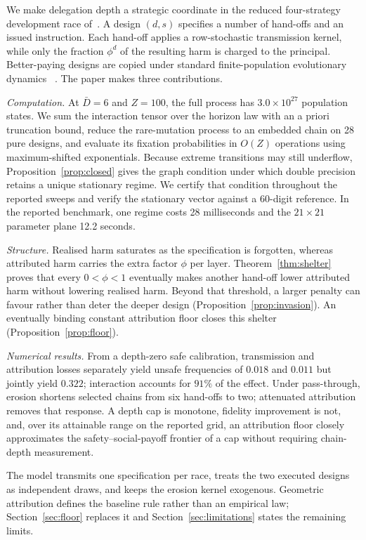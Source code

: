 \documentclass[a4paper,fleqn]{cas-sc}
\begin{document}
We make delegation depth a strategic coordinate in the reduced four-strategy
development race of~\citet{domingos2026falling}. A design $(d,s)$ specifies a
number of hand-offs and an issued instruction. Each hand-off applies a
row-stochastic transmission kernel, while only the fraction $\phi^{d}$ of the
resulting harm is charged to the principal. Better-paying designs are copied
under standard finite-population evolutionary dynamics
~\citep{taylor1978ess,hofbauer1998evolutionary,traulsen2006stochastic}. The
paper makes three contributions.

\emph{Computation.} At $\bar D=6$ and $Z=100$, the full process has
$3.0\times10^{27}$ population states. We sum the interaction tensor over the
horizon law with an a priori truncation bound, reduce the rare-mutation process
to an embedded chain on 28 pure designs, and evaluate its fixation probabilities
in $O(Z)$ operations using maximum-shifted exponentials. Because extreme
transitions may still underflow, Proposition~\ref{prop:closed} gives the graph
condition under which double precision retains a unique stationary regime. We
certify that condition throughout the reported sweeps and verify the stationary
vector against a 60-digit reference. In the reported benchmark, one regime
costs 28 milliseconds and the $21\times21$ parameter plane 12.2 seconds.

\emph{Structure.} Realised harm saturates as the specification is forgotten,
whereas attributed harm carries the extra factor $\phi$ per layer.
Theorem~\ref{thm:shelter} proves that every $0<\phi<1$ eventually makes another
hand-off lower attributed harm without lowering realised harm. Beyond that
threshold, a larger penalty can favour rather than deter the deeper design
(Proposition~\ref{prop:invasion}). An eventually binding constant attribution
floor closes this shelter (Proposition~\ref{prop:floor}).

\emph{Numerical results.} From a depth-zero safe calibration, transmission and
attribution losses separately yield unsafe frequencies of $0.018$ and $0.011$
but jointly yield $0.322$; interaction accounts for $91\%$ of the effect.
Under pass-through, erosion shortens selected chains from six hand-offs to two;
attenuated attribution removes that response. A depth cap is monotone, fidelity
improvement is not, and, over its attainable range on the reported grid, an
attribution floor closely approximates the safety--social-payoff frontier of a
cap without requiring chain-depth measurement.

The model transmits one specification per race, treats the two executed designs
as independent draws, and keeps the erosion kernel exogenous. Geometric
attribution defines the baseline rule rather than an empirical law;
Section~\ref{sec:floor} replaces it and Section~\ref{sec:limitations} states the
remaining limits.
\end{document}
